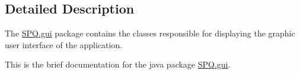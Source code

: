 \subsection{Detailed Description}
The \mbox{\hyperlink{namespace_s_p_q_1_1gui}{S\+P\+Q.\+gui}} package contains the classes responsible for displaying the graphic user interface of the application. 

This is the brief documentation for the java package \mbox{\hyperlink{namespace_s_p_q_1_1gui}{S\+P\+Q.\+gui}}. 